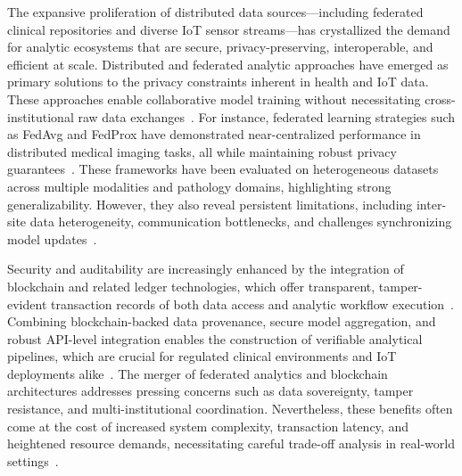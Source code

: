 \documentclass[sigconf]{acmart}
\begin{document}
The expansive proliferation of distributed data sources—including federated clinical repositories and diverse IoT sensor streams—has crystallized the demand for analytic ecosystems that are secure, privacy-preserving, interoperable, and efficient at scale. Distributed and federated analytic approaches have emerged as primary solutions to the privacy constraints inherent in health and IoT data. These approaches enable collaborative model training without necessitating cross-institutional raw data exchanges~\cite{ref4,ref5,ref10,ref13,ref14,ref16,ref17,ref18,ref19,ref20,ref21,ref22,ref23,ref24,ref25,ref30,ref31,ref33,ref34,ref35}. For instance, federated learning strategies such as FedAvg and FedProx have demonstrated near-centralized performance in distributed medical imaging tasks, all while maintaining robust privacy guarantees~\cite{ref31,ref51}. These frameworks have been evaluated on heterogeneous datasets across multiple modalities and pathology domains, highlighting strong generalizability. However, they also reveal persistent limitations, including inter-site data heterogeneity, communication bottlenecks, and challenges synchronizing model updates~\cite{ref4,ref5,ref34,ref82,ref84}.

Security and auditability are increasingly enhanced by the integration of blockchain and related ledger technologies, which offer transparent, tamper-evident transaction records of both data access and analytic workflow execution~\cite{ref13,ref14,ref16,ref19,ref21,ref22,ref23,ref30,ref32,ref31}. Combining blockchain-backed data provenance, secure model aggregation, and robust API-level integration enables the construction of verifiable analytical pipelines, which are crucial for regulated clinical environments and IoT deployments alike~\cite{ref20,ref35,ref44,ref45,ref46,ref50,ref51,ref61,ref62,ref64,ref65,ref76,ref77,ref106}. The merger of federated analytics and blockchain architectures addresses pressing concerns such as data sovereignty, tamper resistance, and multi-institutional coordination. Nevertheless, these benefits often come at the cost of increased system complexity, transaction latency, and heightened resource demands, necessitating careful trade-off analysis in real-world settings~\cite{ref44,ref90,ref106}.
\end{document}
